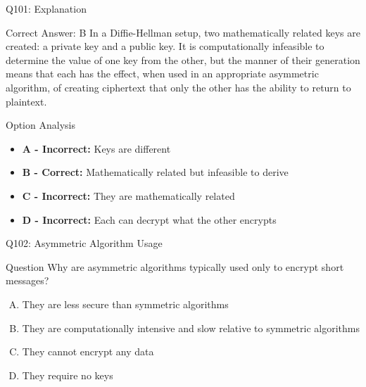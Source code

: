 \documentclass{beamer}
\begin{document}
	\begin{frame}{Q101: Explanation}
		\begin{block}{Correct Answer: B}
			In a Diffie-Hellman setup, two mathematically related keys are created: a private key and a public key. It is computationally infeasible to determine the value of one key from the other, but the manner of their generation means that each has the effect, when used in an appropriate asymmetric algorithm, of creating ciphertext that only the other has the ability to return to plaintext.
		\end{block}
		\begin{block}{Option Analysis}
			\begin{itemize}
				\item \textbf{A - Incorrect:} Keys are different
				\item \textbf{B - Correct:} Mathematically related but infeasible to derive
				\item \textbf{C - Incorrect:} They are mathematically related
				\item \textbf{D - Incorrect:} Each can decrypt what the other encrypts
			\end{itemize}
		\end{block}
	\end{frame}
	
	\begin{frame}{Q102: Asymmetric Algorithm Usage}
		\begin{block}{Question}
			Why are asymmetric algorithms typically used only to encrypt short messages?
		\end{block}
		\begin{enumerate}[(A)]
			\item They are less secure than symmetric algorithms
			\item They are computationally intensive and slow relative to symmetric algorithms
			\item They cannot encrypt any data
			\item They require no keys
		\end{enumerate}
	\end{frame}
	
\end{document}
